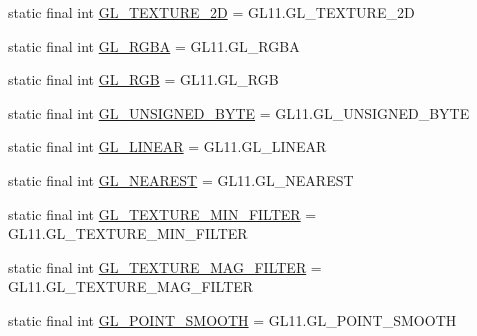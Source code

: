 \begin{DoxyCompactItemize}
\item 
static final int \mbox{\hyperlink{interfaceorg_1_1newdawn_1_1slick_1_1opengl_1_1renderer_1_1_s_g_l_a5f50303f755e01438024a54465b23bd0}{G\+L\+\_\+\+T\+E\+X\+T\+U\+R\+E\+\_\+2D}} = G\+L11.\+G\+L\+\_\+\+T\+E\+X\+T\+U\+R\+E\+\_\+2D
\item 
static final int \mbox{\hyperlink{interfaceorg_1_1newdawn_1_1slick_1_1opengl_1_1renderer_1_1_s_g_l_a8228b3f2522fce0f773f77da38b5db52}{G\+L\+\_\+\+R\+G\+BA}} = G\+L11.\+G\+L\+\_\+\+R\+G\+BA
\item 
static final int \mbox{\hyperlink{interfaceorg_1_1newdawn_1_1slick_1_1opengl_1_1renderer_1_1_s_g_l_a857226d26f904acf88a5304b9b13f956}{G\+L\+\_\+\+R\+GB}} = G\+L11.\+G\+L\+\_\+\+R\+GB
\item 
static final int \mbox{\hyperlink{interfaceorg_1_1newdawn_1_1slick_1_1opengl_1_1renderer_1_1_s_g_l_a9d626cb9fbba2ebaf0f66fdc24c81965}{G\+L\+\_\+\+U\+N\+S\+I\+G\+N\+E\+D\+\_\+\+B\+Y\+TE}} = G\+L11.\+G\+L\+\_\+\+U\+N\+S\+I\+G\+N\+E\+D\+\_\+\+B\+Y\+TE
\item 
static final int \mbox{\hyperlink{interfaceorg_1_1newdawn_1_1slick_1_1opengl_1_1renderer_1_1_s_g_l_a8324736c2426087b7057fb3c6810b9b2}{G\+L\+\_\+\+L\+I\+N\+E\+AR}} = G\+L11.\+G\+L\+\_\+\+L\+I\+N\+E\+AR
\item 
static final int \mbox{\hyperlink{interfaceorg_1_1newdawn_1_1slick_1_1opengl_1_1renderer_1_1_s_g_l_a22942dd240fca8f1c4e4fcbf27a194dc}{G\+L\+\_\+\+N\+E\+A\+R\+E\+ST}} = G\+L11.\+G\+L\+\_\+\+N\+E\+A\+R\+E\+ST
\item 
static final int \mbox{\hyperlink{interfaceorg_1_1newdawn_1_1slick_1_1opengl_1_1renderer_1_1_s_g_l_a8b6856c305a08152807b7a75ba55dbc9}{G\+L\+\_\+\+T\+E\+X\+T\+U\+R\+E\+\_\+\+M\+I\+N\+\_\+\+F\+I\+L\+T\+ER}} = G\+L11.\+G\+L\+\_\+\+T\+E\+X\+T\+U\+R\+E\+\_\+\+M\+I\+N\+\_\+\+F\+I\+L\+T\+ER
\item 
static final int \mbox{\hyperlink{interfaceorg_1_1newdawn_1_1slick_1_1opengl_1_1renderer_1_1_s_g_l_a2a21c6a78f6e0b7289066941ddfa91b5}{G\+L\+\_\+\+T\+E\+X\+T\+U\+R\+E\+\_\+\+M\+A\+G\+\_\+\+F\+I\+L\+T\+ER}} = G\+L11.\+G\+L\+\_\+\+T\+E\+X\+T\+U\+R\+E\+\_\+\+M\+A\+G\+\_\+\+F\+I\+L\+T\+ER
\item 
static final int \mbox{\hyperlink{interfaceorg_1_1newdawn_1_1slick_1_1opengl_1_1renderer_1_1_s_g_l_ad3e0cbb288b51c345de7dee0d16c40e2}{G\+L\+\_\+\+P\+O\+I\+N\+T\+\_\+\+S\+M\+O\+O\+TH}} = G\+L11.\+G\+L\+\_\+\+P\+O\+I\+N\+T\+\_\+\+S\+M\+O\+O\+TH
\item 

\end{DoxyCompactItemize}
